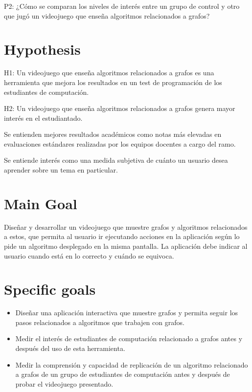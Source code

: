 \documentclass[submission]{eptcs}
\begin{document}
P2: ¿Cómo se comparan los niveles de interés entre un grupo de control y otro que jugó un videojuego
que enseña algoritmos relacionados a grafos?


\section{Hypothesis}

H1: Un videojuego que enseña algoritmos relacionados a grafos es una herramienta
que mejora los resultados en un test de programación de los estudiantes de computación.

H2: Un videojuego que enseña algoritmos relacionados a grafos genera mayor interés
en el estudiantado.

Se entienden mejores resultados académicos como notas más elevadas en evaluaciones estándares
realizadas por los equipos docentes a cargo del ramo.

Se entiende interés como una medida subjetiva de cuánto un usuario desea
aprender sobre un tema en particular. 

\section{Main Goal}



Diseñar y desarrollar un videojuego que muestre grafos y algoritmos relacionados a estos,
que permita al usuario ir ejecutando acciones en la aplicación según lo pide un algoritmo
desplegado en la misma pantalla. La aplicación debe indicar al usuario cuando está en lo
correcto y cuándo se equivoca.

\section{Specific goals}

\begin{itemize}
\item Diseñar una aplicación interactiva que muestre grafos y permita seguir
los pasos relacionados a algoritmos que trabajen con grafos.

\item Medir el interés de estudiantes de computación relacionado a grafos
antes y después del uso de esta herramienta.

\item Medir la comprensión y capacidad de replicación de un algoritmo relacionado a grafos
de un grupo de estudiantes de computación antes y después de probar el videojuego presentado.

\end{itemize}
\end{document}
